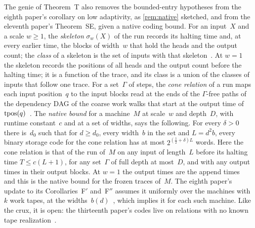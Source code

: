 The genie of Theorem~T also removes the bounded-entry hypotheses from the eighth paper's corollary on low adaptivity, as
\cref{rem:native} sketched, and from the eleventh paper's Theorem~SE, given a native coding bound. For an input~$X$ and a
scale $w\ge1$, the \emph{skeleton} $\sigma_w(X)$ of the run records its halting time and, at every earlier time, the blocks of
width~$w$ that hold the heads and the output count; the \emph{class} of a skeleton is the set of inputs with that
skeleton~\cite[Definition~4.1]{MergeDepth2026}. At $w=1$ the skeleton records the positions of all heads and the output count
before the halting time; it is a function of the trace, and its class is a union of the classes of inputs that follow one
trace. For a set~$\Gamma$ of steps, the \emph{cone relation} of a run maps each input position~$q$ to the input blocks read
at the ends of the $\Gamma$-free paths of the dependency DAG of the coarse work walks that start at the output time
of~$\operatorname{tpos}(q)$~\cite[Lemma~4.7]{MergeDepth2026}. The \emph{native bound} for a machine~$M$ at scale~$w$ and depth~$D$, with
runtime constant~$c$ and at a set of widths, says the following. For every $\delta>0$ there is~$d_0$ such that for $d\ge d_0$,
every width~$b$ in the set and $L=d^2b$, every binary storage code for the cone relation has at most $2^{(\frac12+\delta)L}$
words. Here the cone relation is that of the run of~$M$ on any input of length~$L$ before its halting time $T\le c(L+1)$, for
any set~$\Gamma$ of full depth at most~$D$, and with any output times in their output blocks. At $w=1$ the output times are the
append times and this is the native bound for the frozen traces of~$M$. The eighth paper's update to its Corollaries~F$'$
and~F$''$ assumes it uniformly over the machines with $k$ work tapes, at the widths~$b(d)$~\cite[Section~6.2]{EighthPaper2026},
which implies it for each such machine. Like the
crux, it is open: the thirteenth paper's codes live on relations with no known tape realization~\cite{StorageCodes2026}.

